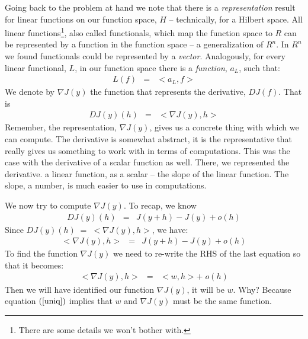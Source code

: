 \documentclass{article}
\begin{document}
Going back to the problem at hand we note that there is
a {\em representation\/} result for linear functions on our function space,
$H$ -- technically, for a Hilbert space.
All linear functions\footnote{There are some details we won't bother with.}, also called
functionals, which map the function space to $R$
can be represented by a function in the function space
-- a generalization of $R^n$. In $R^n$ we found functionals could be
represented by a {\em vector\/}. Analogously, for every linear functional, $L$,
in our function space there is a {\em function\/}, $a_L$, such that:
\begin{eqnarray}
L(f) & = & <\!a_L, f\!>
\end{eqnarray}
We denote by $\nabla J(y)$ the
function that represents the derivative, $DJ(f)$. That is
\begin{eqnarray}
  DJ(y)(h) & = & <\!\nabla J(y), h\!>
\end{eqnarray}
Remember, the
representation, $\nabla J(y)$, gives us a concrete thing with which we can compute.
The derivative is somewhat abstract, it is the representative that really
gives us something to work with in terms of computations. This was the case
with the derivative of a scalar function as well. There, we represented the derivative.
a linear function, as a scalar -- the slope of the linear function. The slope, a
number, is much easier to use in computations.

We now try to compute $\nabla J(y)$.
To recap, we know
\begin{eqnarray}
  DJ(y)(h) & = & J(y+h) - J(y) + o(h)
\end{eqnarray}
Since $DJ(y)(h) \; = \; <\!\nabla J(y), h\!>$, we have:
\begin{eqnarray}
  <\!\nabla J(y), h\!> & = & J(y+h) - J(y) + o(h) \label{grad_eq}
\end{eqnarray}
To find the function $\nabla J(y)$ we need to re-write the RHS of the last equation
so that it becomes:
\begin{eqnarray}
  <\!\nabla J(y), h\!> & = & <\!w, h\!> + \; o(h) \label{uniq}
\end{eqnarray}
Then we will have identified our function $\nabla J(y)$, it will be $w$. Why? Because
equation $(\ref{uniq})$ implies that $w$ and $\nabla J(y)$ must be the same function.
\end{document}
